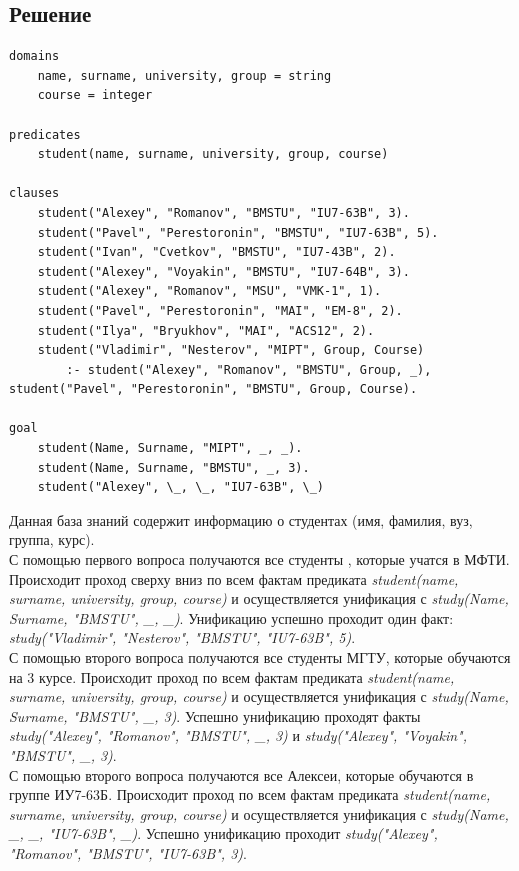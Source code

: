 \documentclass[12pt]{report}
\begin{document}
\subsection*{Решение}
\begin{lstlisting}
domains 
	name, surname, university, group = string
	course = integer

predicates
	student(name, surname, university, group, course)

clauses
	student("Alexey", "Romanov", "BMSTU", "IU7-63B", 3).
	student("Pavel", "Perestoronin", "BMSTU", "IU7-63B", 5).
	student("Ivan", "Cvetkov", "BMSTU", "IU7-43B", 2).
	student("Alexey", "Voyakin", "BMSTU", "IU7-64B", 3).
	student("Alexey", "Romanov", "MSU", "VMK-1", 1).
	student("Pavel", "Perestoronin", "MAI", "EM-8", 2).
	student("Ilya", "Bryukhov", "MAI", "ACS12", 2).
	student("Vladimir", "Nesterov", "MIPT", Group, Course) 
		:- student("Alexey", "Romanov", "BMSTU", Group, _),  student("Pavel", "Perestoronin", "BMSTU", Group, Course).

goal
	student(Name, Surname, "MIPT", _, _).
	student(Name, Surname, "BMSTU", _, 3).
	student("Alexey", \_, \_, "IU7-63B", \_)
\end{lstlisting}

Данная база знаний содержит информацию о студентах (имя, фамилия, вуз, группа, курс).\\

С помощью первого вопроса получаются все студенты , которые учатся в МФТИ. Происходит проход сверху вниз по всем фактам предиката \emph{student(name, surname, university, group, course)} и осуществляется унификация с \emph{study(Name, Surname, "BMSTU"{}, \_, \_)}. Унификацию успешно проходит один факт: \emph{study("Vladimir"{}, "Nesterov"{}, "BMSTU"{}, "IU7-63B"{}, 5)}.\\

С помощью второго вопроса получаются все студенты МГТУ, которые обучаются на 3 курсе.  Происходит проход по всем фактам предиката \emph{student(name, surname, university, group, course)} и осуществляется унификация с \emph{study(Name, Surname, "BMSTU"{}, \_, 3)}.  Успешно унификацию проходят факты \emph{study("Alexey"{}, "Romanov"{}, "BMSTU"{}, \_, 3)} и \emph{study("Alexey"{}, "Voyakin"{}, "BMSTU"{}, \_, 3)}.\\

С помощью второго вопроса получаются все Алексеи, которые обучаются в группе ИУ7-63Б.  Происходит проход по всем фактам предиката \emph{student(name, surname, university, group, course)} и осуществляется унификация с \emph{study(Name, \_, \_, "IU7-63B"{}, \_)}.  Успешно унификацию проходит \emph{study("Alexey"{}, "Romanov"{}, "BMSTU"{}, "IU7-63B"{}, 3)}.\\
\end{document}

